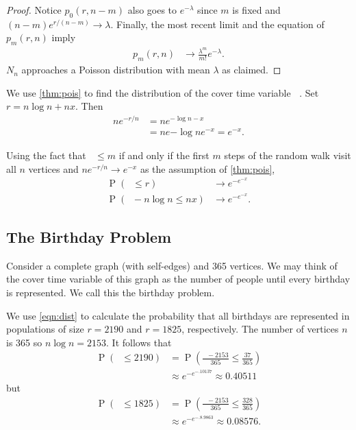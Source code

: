 \documentclass[12pt]{article}
\theoremstyle{definition}
\DeclareMathOperator{\pr}{\mathrm{P}}		     %
\DeclareMathOperator{\cov}{\uptau_\textrm{cov}}  %
\begin{document}
\begin{proof}
Notice $p_0(r,n-m)$ also goes to $e^{-\lambda}$
since $m$ is fixed and $(n-m)e^{r/(n-m)} \rightarrow \lambda$.
Finally, the most recent limit and the equation of $p_m(r,n)$ imply
\begin{align}
p_m(r,n) 
&\rightarrow \frac{\lambda^m}{ m!} e^{-\lambda} \nonumber.
\end{align}
$N_n$ approaches a Poisson distribution with mean $\lambda$ as claimed.

\end{proof}


We use \cref{thm:pois} to find the distribution of the cover time variable $\cov$.
Set $r = n \log n + nx$.
Then 
\begin{align}
ne^{-r/n} &= n e ^{- \log n - x} \nonumber \\
&= n e {- \log n} e^ {- x} = e^{-x}.\nonumber
\end{align}

Using the fact that $\cov \leq m$ if and only if the first $m$ steps
of the random walk visit all $n$ vertices
and $ne^{-r/n} \rightarrow e^{-x}$ as the assumption of \cref{thm:pois},
\begin{align}
\pr(\cov \leq r) &\rightarrow e^{-e^{-x}} \nonumber \\
\pr(\cov - n \log n\leq nx) &\rightarrow e^{-e^{-x}}. \label{eqn:dist}
\end{align}

\subsection{The Birthday Problem}\label{sec:birthday}
Consider a complete graph (with self-edges) and 365 vertices.
We may think of the cover time variable of this graph as the number of people
until every birthday is represented.
We call this the birthday problem.

We use \cref{eqn:dist} to calculate the probability
that all birthdays are represented in populations of 
size $r=2190$ and $r=1825$, respectively.
The number of vertices $n$ is 365 so $n\log n = 2153$.
It follows that
\begin{align}
\pr(\cov \leq 2190) &= \pr \left(\frac{\cov - 2153}{365} \leq
\frac{37}{365}\right) \nonumber \\
&\approx e^{-e^{-.10137}} \approx 0.40511 \nonumber
\end{align}
but 
\begin{align}
\pr(\cov \leq 1825) &= \pr \left(\frac{\cov - 2153}{365} \leq
\frac{328}{365}\right) \nonumber \\
&\approx e^{-e^{-.8.9863}} \approx 0.08576. \nonumber
\end{align}
\end{document}
